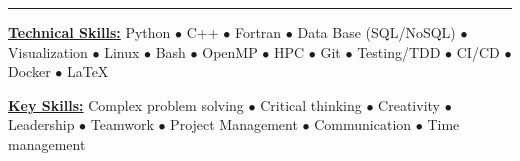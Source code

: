 \vspace*{-10mm}

\begin{center}
    \par\rule{1.0\textwidth}{0.6pt}
\end{center}
\vspace*{-8mm}


\begin{multicols}{2}
    \begin{spacing}{1}
        \href{.}{\bf Technical Skills:}
        Python $\bullet$ C++ $\bullet$ Fortran $\bullet$ Data Base (SQL/NoSQL) $\bullet$ Visualization $\bullet$ Linux $\bullet$ Bash $\bullet$ OpenMP $\bullet$ HPC $\bullet$ Git $\bullet$ Testing/TDD $\bullet$ CI/CD $\bullet$ Docker $\bullet$ \LaTeX~ %

        \href{.}{\bf Key Skills:}
        Complex problem solving $\bullet$ Critical thinking $\bullet$ Creativity $\bullet$ Leadership $\bullet$ Teamwork $\bullet$ Project Management $\bullet$ Communication $\bullet$ Time management
    \end{spacing}
\end{multicols}


